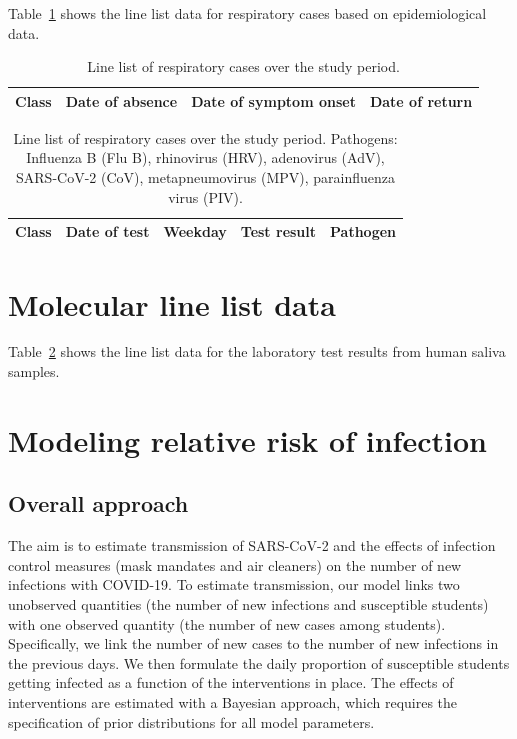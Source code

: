 \documentclass[fleqn,11pt]{wlscirep_supp}
\begin{document}
Table~\ref{tab:epi-data-line-list} shows the line list data for respiratory cases based on epidemiological data.

{\footnotesize\begin{longtable}{l l l l}
    \caption[Line list of respiratory cases over the study period]{Line list of respiratory cases over the study period.}\label{tab:epi-data-line-list} \\
    \toprule
    Class & Date of absence & Date of symptom onset & Date of return \\
    \midrule
    
    \bottomrule
\end{longtable}}

\clearpage

{\footnotesize\begin{longtable}{l l l l l}
    \caption[Line list of molecular test results over the study period]{Line list of respiratory cases over the study period. Pathogens: Influenza B (Flu B), rhinovirus (HRV), adenovirus (AdV), SARS-CoV-2 (CoV), metapneumovirus (MPV), parainfluenza virus (PIV).}\label{tab:mol-data-line-list} \\
    \toprule
    Class & Date of test & Weekday & Test result & Pathogen \\
    \midrule
    
    \bottomrule
\end{longtable}}

\clearpage

\section{Molecular line list data}\label{sec:mol-data}

Table~\ref{tab:mol-data-line-list} shows the line list data for the laboratory test results from human saliva samples.

\clearpage

\section{Modeling relative risk of infection}\label{sec:transmission-model}

\subsection{Overall approach}

The aim is to estimate transmission of SARS-CoV-2 and the effects of infection control measures (mask mandates and air cleaners) on the number of new infections with COVID-19. To estimate transmission, our model links two unobserved quantities (the number of new infections and susceptible students) with one observed quantity (the number of new cases among students). Specifically, we link the number of new cases to the number of new infections in the previous days. We then formulate the daily proportion of susceptible students getting infected as a function of the interventions in place. The effects of interventions are estimated with a Bayesian approach, which requires the specification of prior distributions for all model parameters.
\end{document}
